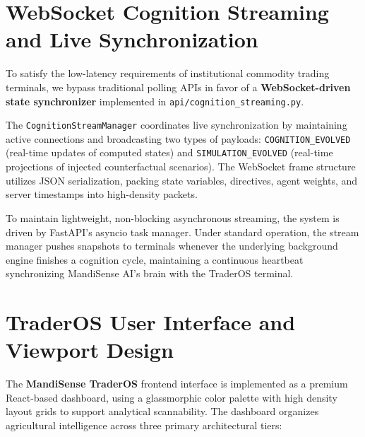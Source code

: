 \documentclass[12pt,a4paper]{report}
\begin{document}
\section{WebSocket Cognition Streaming and Live Synchronization}

To satisfy the low-latency requirements of institutional commodity trading terminals, we bypass traditional polling APIs in favor of a \textbf{WebSocket-driven state synchronizer} implemented in \texttt{api/cognition\_streaming.py}. 

The \texttt{CognitionStreamManager} coordinates live synchronization by maintaining active connections and broadcasting two types of payloads: \texttt{COGNITION\_EVOLVED} (real-time updates of computed states) and \texttt{SIMULATION\_EVOLVED} (real-time projections of injected counterfactual scenarios). The WebSocket frame structure utilizes JSON serialization, packing state variables, directives, agent weights, and server timestamps into high-density packets. 

To maintain lightweight, non-blocking asynchronous streaming, the system is driven by FastAPI's asyncio task manager. Under standard operation, the stream manager pushes snapshots to terminals whenever the underlying background engine finishes a cognition cycle, maintaining a continuous heartbeat synchronizing MandiSense AI's brain with the TraderOS terminal.

\section{TraderOS User Interface and Viewport Design}

The \textbf{MandiSense TraderOS} frontend interface is implemented as a premium React-based dashboard, using a glassmorphic color palette with high density layout grids to support analytical scannability. The dashboard organizes agricultural intelligence across three primary architectural tiers:
\end{document}
